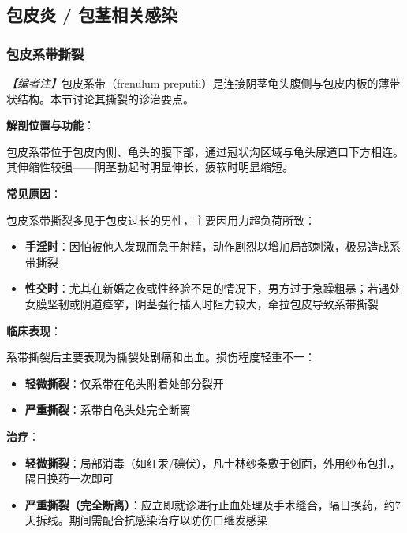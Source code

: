 \subsection{包皮炎 / 包茎相关感染}

\subsubsection{包皮系带撕裂}

\noindent\textit{【编者注】}包皮系带（frenulum preputii）是连接阴茎龟头腹侧与包皮内板的薄带状结构。本节讨论其撕裂的诊治要点。

\vspace{0.5em}
\noindent\textbf{解剖位置与功能}：

包皮系带位于包皮内侧、龟头的腹下部，通过冠状沟区域与龟头尿道口下方相连。其伸缩性较强——阴茎勃起时明显伸长，疲软时明显缩短。

\vspace{0.5em}
\noindent\textbf{常见原因}：

包皮系带撕裂多见于包皮过长的男性，主要因用力超负荷所致：
\begin{itemize}
	\item \textbf{手淫时}：因怕被他人发现而急于射精，动作剧烈以增加局部刺激，极易造成系带撕裂
	\item \textbf{性交时}：尤其在新婚之夜或性经验不足的情况下，男方过于急躁粗暴；若遇处女膜坚韧或阴道痉挛，阴茎强行插入时阻力较大，牵拉包皮导致系带撕裂
\end{itemize}

\vspace{0.5em}
\noindent\textbf{临床表现}：

系带撕裂后主要表现为撕裂处剧痛和出血。损伤程度轻重不一：
\begin{itemize}
	\item \textbf{轻微撕裂}：仅系带在龟头附着处部分裂开
	\item \textbf{严重撕裂}：系带自龟头处完全断离
\end{itemize}

\vspace{0.5em}
\noindent\textbf{治疗}：
\begin{itemize}
	\item \textbf{轻微撕裂}：局部消毒（如红汞/碘伏），凡士林纱条敷于创面，外用纱布包扎，隔日换药一次即可
	\item \textbf{严重撕裂（完全断离）}：应立即就诊进行止血处理及手术缝合，隔日换药，约7天拆线。期间需配合抗感染治疗以防伤口继发感染
\end{itemize}

